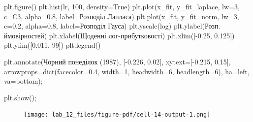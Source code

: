 \documentclass[
  letterpaper,
]{report}
\newenvironment{Shaded}{\begin{snugshade}}{\end{snugshade}}
\newcommand{\BuiltInTok}[1]{\textcolor[rgb]{0.00,0.23,0.31}{#1}}
\newcommand{\DecValTok}[1]{\textcolor[rgb]{0.68,0.00,0.00}{#1}}
\newcommand{\FloatTok}[1]{\textcolor[rgb]{0.68,0.00,0.00}{#1}}
\newcommand{\NormalTok}[1]{\textcolor[rgb]{0.00,0.23,0.31}{#1}}
\newcommand{\OperatorTok}[1]{\textcolor[rgb]{0.37,0.37,0.37}{#1}}
\newcommand{\StringTok}[1]{\textcolor[rgb]{0.13,0.47,0.30}{#1}}
\newcommand{\VariableTok}[1]{\textcolor[rgb]{0.07,0.07,0.07}{#1}}
\begin{document}
\begin{Shaded}
\begin{Highlighting}[]
\NormalTok{plt.figure()}
\NormalTok{plt.hist(lr, }\DecValTok{100}\NormalTok{, density}\OperatorTok{=}\VariableTok{True}\NormalTok{)}
\NormalTok{plt.plot(x\_fit, y\_fit\_laplace, lw}\OperatorTok{=}\DecValTok{3}\NormalTok{, c}\OperatorTok{=}\StringTok{\textquotesingle{}C3\textquotesingle{}}\NormalTok{, alpha}\OperatorTok{=}\FloatTok{0.8}\NormalTok{, label}\OperatorTok{=}\StringTok{\textquotesingle{}Розподіл Лапласа\textquotesingle{}}\NormalTok{)}
\NormalTok{plt.plot(x\_fit, y\_fit\_norm, lw}\OperatorTok{=}\DecValTok{3}\NormalTok{, c}\OperatorTok{=}\StringTok{\textquotesingle{}0.2\textquotesingle{}}\NormalTok{, alpha}\OperatorTok{=}\FloatTok{0.8}\NormalTok{, label}\OperatorTok{=}\StringTok{\textquotesingle{}Розподіл Гауса\textquotesingle{}}\NormalTok{)}
\NormalTok{plt.yscale(}\StringTok{\textquotesingle{}log\textquotesingle{}}\NormalTok{)}
\NormalTok{plt.ylabel(}\StringTok{\textquotesingle{}Розп. ймовірностей\textquotesingle{}}\NormalTok{)}
\NormalTok{plt.xlabel(}\StringTok{\textquotesingle{}Щоденні лог{-}прибутковості\textquotesingle{}}\NormalTok{)}
\NormalTok{plt.xlim([}\OperatorTok{{-}}\FloatTok{0.25}\NormalTok{, }\FloatTok{0.125}\NormalTok{])}
\NormalTok{plt.ylim([}\FloatTok{0.011}\NormalTok{, }\DecValTok{99}\NormalTok{])}
\NormalTok{plt.legend()}

\NormalTok{plt.annotate(}\StringTok{\textquotesingle{}Чорний понеділок (1987)\textquotesingle{}}\NormalTok{, [}\OperatorTok{{-}}\FloatTok{0.226}\NormalTok{, }\FloatTok{0.02}\NormalTok{], xytext}\OperatorTok{=}\NormalTok{[}\OperatorTok{{-}}\FloatTok{0.215}\NormalTok{, }\FloatTok{0.15}\NormalTok{],}
\NormalTok{             arrowprops}\OperatorTok{=}\BuiltInTok{dict}\NormalTok{(facecolor}\OperatorTok{=}\StringTok{\textquotesingle{}0.4\textquotesingle{}}\NormalTok{, width}\OperatorTok{=}\DecValTok{1}\NormalTok{, headwidth}\OperatorTok{=}\DecValTok{6}\NormalTok{, headlength}\OperatorTok{=}\DecValTok{6}\NormalTok{),}
\NormalTok{             ha}\OperatorTok{=}\StringTok{\textquotesingle{}left\textquotesingle{}}\NormalTok{, va}\OperatorTok{=}\StringTok{\textquotesingle{}bottom\textquotesingle{}}\NormalTok{)}\OperatorTok{;}

\NormalTok{plt.show()}\OperatorTok{;}
\end{Highlighting}
\end{Shaded}

\begin{figure}[H]

{\centering \texttt{[image: lab\_12\_files/figure-pdf/cell-14-output-1.png]}

}

\end{figure}
\end{document}
